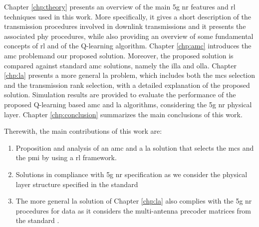 Chapter \ref{chp:theory} presents an overview of the main \gls{5g} \gls{nr} features and \gls{rl} techniques used in this work.
%
More specifically, it gives a short description of the transmission procedures involved in downlink transmissions and it presents the associated \gls{phy} procedures, while also providing an overview of some fundamental concepts of \gls{rl} and of the Q-learning algorithm.
%
Chapter \ref{chp:amc} introduces the \gls{amc} problemand our proposed solution. Moreover, the proposed solution is compared against standard \gls{amc} solutions, namely the \gls{illa} and \gls{olla}.
%
Chapter \ref{chp:la} presents a more general \gls{la} problem, which includes both the \gls{mcs} selection and the transmission rank selection, with a detailed explanation of the proposed solution.
%
Simulation results are provided to evaluate the performance of the proposed Q-learning based \gls{amc} and \gls{la} algorithms, considering the \gls{5g} \gls{nr} physical layer.
%
Chapter \ref{chp:conclusion} summarizes the main conclusions of this work.

Therewith, the main contributions of this work are:
\begin{enumerate}
    \item Proposition and analysis of an \gls{amc} and a \gls{la} solution that selects the \gls{mcs} and the \gls{pmi} by using a \gls{rl} framework.
    \item Solutions in compliance with \gls{5g} \gls{nr} specification as we consider the physical layer structure specified in the standard \cite{3gpp.38.212}
    \item The more general \gls{la} solution of Chapter \ref{chp:la} also complies with the \gls{5g} \gls{nr} procedures for data as it considers the multi-antenna precoder matrices from the standard \cite{3gpp.38.214}.
\end{enumerate}
%


